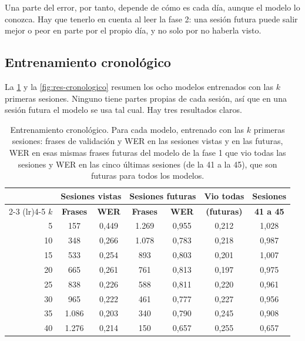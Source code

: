 Una parte del error, por tanto, depende de cómo es cada día, aunque el modelo lo conozca. Hay que tenerlo en cuenta al leer la fase 2: una sesión futura puede salir mejor o peor en parte por el propio día, y no solo por no haberla visto.

\subsection{Entrenamiento cronológico}
\label{sec:res-cronologico}

La \cref{tab:res-cronologico} y la \cref{fig:res-cronologico} resumen los ocho modelos entrenados con las $k$ primeras sesiones. Ninguno tiene partes propias de cada sesión, así que en una sesión futura el modelo se usa tal cual. Hay tres resultados claros.

\begin{table}[htbp]
  \centering
  \caption[Entrenamiento cronológico. Para cada modelo, entrenado con las $k$ primeras sesiones]{Entrenamiento cronológico. Para cada modelo, entrenado con las $k$ primeras sesiones: frases de validación y WER en las sesiones vistas y en las futuras, WER en esas mismas frases futuras del modelo de la fase 1 que vio todas las sesiones y WER en las cinco últimas sesiones (de la 41 a la 45), que son futuras para todos los modelos.}
  \label{tab:res-cronologico}
  \small
  \begin{tabular}{rcccccc}
    \toprule
    & \multicolumn{2}{c}{\textbf{Sesiones vistas}} & \multicolumn{2}{c}{\textbf{Sesiones futuras}} & \textbf{Vio todas} & \textbf{Sesiones} \\
    \cmidrule(lr){2-3} \cmidrule(lr){4-5}
    $k$ & \textbf{Frases} & \textbf{WER} & \textbf{Frases} & \textbf{WER} & \textbf{(futuras)} & \textbf{41 a 45} \\
    \midrule
    5  & 157   & 0,449 & 1.269 & 0,955 & 0,212 & 1,028 \\
    10 & 348   & 0,266 & 1.078 & 0,783 & 0,218 & 0,987 \\
    15 & 533   & 0,254 & 893   & 0,803 & 0,201 & 1,007 \\
    20 & 665   & 0,261 & 761   & 0,813 & 0,197 & 0,975 \\
    25 & 838   & 0,226 & 588   & 0,811 & 0,220 & 0,961 \\
    30 & 965   & 0,222 & 461   & 0,777 & 0,227 & 0,956 \\
    35 & 1.086 & 0,203 & 340   & 0,790 & 0,245 & 0,908 \\
    40 & 1.276 & 0,214 & 150   & 0,657 & 0,255 & 0,657 \\
    \bottomrule
  \end{tabular}
\end{table}

